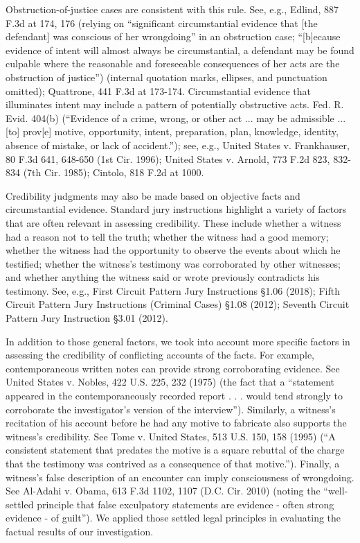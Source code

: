 Obstruction-of-justice cases are consistent with this rule. 
See, e.g., Edlind, 887 F.3d at 174, 176 (relying on “significant circumstantial evidence that [the defendant] was conscious of her wrongdoing” in an obstruction case; “[b]ecause evidence of intent will almost always be circumstantial, a defendant may be found culpable where the reasonable and foreseeable consequences of her acts are the obstruction of justice”) (internal quotation marks, ellipses, and punctuation omitted); 
Quattrone, 441 F.3d at 173-174. 
Circumstantial evidence that illuminates intent may include a pattern of potentially obstructive acts. Fed. R. Evid. 404(b) (“Evidence of a crime, wrong, or other act ... may be admissible ... [to] prov[e] motive, opportunity, intent, preparation, plan, knowledge, identity, absence of mistake, or lack of accident.”); 
see, e.g., United States v. Frankhauser, 80 F.3d 641, 648-650 (1st Cir. 1996); 
United States v. Arnold, 773 F.2d 823, 832-834 (7th Cir. 1985); 
Cintolo, 818 F.2d at 1000. 

Credibility judgments may also be made based on objective facts and circumstantial evidence. 
Standard jury instructions highlight a variety of factors that are often relevant in assessing credibility. 
These include whether a witness had a reason not to tell the truth; whether the witness had a good memory; 
whether the witness had the opportunity to observe the events about which he testified; 
whether the witness’s testimony was corroborated by other witnesses; 
and whether anything the witness said or wrote previously contradicts his testimony. 
See, e.g., First Circuit Pattern Jury Instructions \S 1.06 (2018); 
Fifth Circuit Pattern Jury Instructions (Criminal Cases) \S 1.08 (2012); 
Seventh Circuit Pattern Jury Instruction \S 3.01 (2012). 

In addition to those general factors, we took into account more specific factors in assessing the credibility of conflicting accounts of the facts. 
For example, contemporaneous written notes can provide strong corroborating evidence. See United States v. Nobles, 422 U.S. 225, 232 (1975) (the fact that a “statement appeared in the contemporaneously recorded report . . . would tend strongly to corroborate the investigator’s version of the interview”). 
Similarly, a witness’s recitation of his account before he had any motive to fabricate also supports the witness’s credibility. 
See Tome v. United States, 513 U.S. 150, 158 (1995) (“A consistent statement that predates the motive is a square rebuttal of the charge that the testimony was contrived as a consequence of that motive.”). 
Finally, a witness’s false description of an encounter can imply consciousness of wrongdoing. 
See Al-Adahi v. Obama, 613 F.3d 1102, 1107 (D.C. Cir. 2010) (noting the “well-settled principle that false exculpatory statements are evidence - often strong evidence - of guilt”). 
We applied those settled legal principles in evaluating the factual results of our investigation. 

